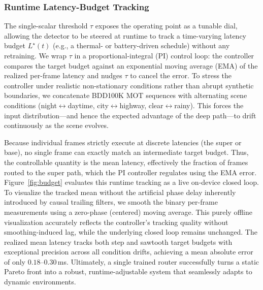 \subsubsection{Runtime Latency-Budget Tracking}
\label{sec:results_budget}
The single-scalar threshold $\tau$ exposes the operating point as a tunable dial, allowing the detector to be steered at runtime to track a time-varying latency budget $L^\star(t)$ (e.g., a thermal- or battery-driven schedule) without any retraining. 
We wrap $\tau$ in a proportional-integral (PI) control loop: the controller compares the target budget against an exponential moving average (EMA) of the realized per-frame latency and nudges $\tau$ to cancel the error. 
To stress the controller under realistic non-stationary conditions rather than abrupt synthetic boundaries, we concatenate BDD100K MOT sequences with alternating scene conditions (night$\leftrightarrow$daytime, city$\leftrightarrow$highway, clear$\leftrightarrow$rainy). 
This forces the input distribution---and hence the expected advantage of the deep path---to drift continuously as the scene evolves.

Because individual frames strictly execute at discrete latencies (the super or base), no single frame can exactly match an intermediate target budget. 
Thus, the controllable quantity is the mean latency, effectively the fraction of frames routed to the super path, which the PI controller regulates using the EMA error. 
Figure~\ref{fig:budget} evaluates this runtime tracking as a live on-device closed loop. 
To visualize the tracked mean without the artificial phase delay inherently introduced by causal trailing filters, we smooth the binary per-frame measurements using a zero-phase (centered) moving average. 
This purely offline visualization accurately reflects the controller's tracking quality without smoothing-induced lag, while the underlying closed loop remains unchanged. 
The realized mean latency tracks both step and sawtooth target budgets with exceptional precision across all condition drifts, achieving a mean absolute error of only $0.18$--$0.30$\,ms. 
Ultimately, a single trained router successfully turns a static Pareto front into a robust, runtime-adjustable system that seamlessly adapts to dynamic environments.


